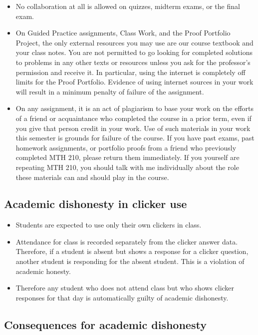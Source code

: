\documentclass[11pt]{article}
\begin{document}
\begin{itemize}[itemsep=0pt]
	\item No collaboration at all is allowed on quizzes, midterm exams, or the final exam.  
	\item On Guided Practice assignments, Class Work, and the Proof Portfolio Project, the only external resources you may use are our course textbook and your class notes. You are not permitted to go looking for completed solutions to problems in any other texts or resources unless you ask for the professor's permission and receive it. In particular, using the internet is completely off limits for the Proof Portfolio. Evidence of using internet sources in your work will result in a minimum penalty of failure of the assignment.
	\item On any assignment, it is an act of plagiarism to base your work on the efforts of a friend or acquaintance who completed the course in a prior term, even if you give that person credit in your work. Use of such materials in your work this semester is grounds for failure of the course. If you have past exams, past homework assignments, or portfolio proofs from a friend who previously completed MTH 210, please return them immediately. If you yourself are repeating MTH 210, you should talk with me individually about the role these materials can and should play in the course.
\end{itemize}

\subsection{Academic dishonesty in clicker use}

\begin{itemize}[itemsep=0pt]
	\item Students are expected to use only their own clickers in class. 
	\item Attendance for class is recorded separately from the clicker answer data. Therefore, if a student is absent but shows a response for a clicker question, another student is responding for the absent student. This is a violation of academic honesty. 
	\item Therefore any student who does not attend class but who shows clicker responses for that day is automatically guilty of academic dishonesty.
\end{itemize}

\subsection{Consequences for academic dishonesty}
\end{document}
